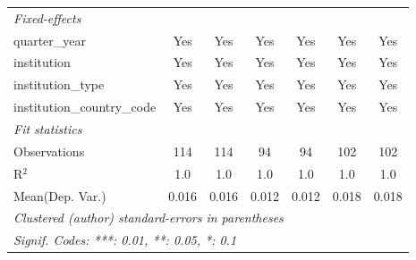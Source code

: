 \begin{tabular}{lcccccc}
   \midrule
   \emph{Fixed-effects}\\
   quarter\_year                      & Yes           & Yes            & Yes            & Yes            & Yes          & Yes\\  
   institution                        & Yes           & Yes            & Yes            & Yes            & Yes          & Yes\\  
   institution\_type                  & Yes           & Yes            & Yes            & Yes            & Yes          & Yes\\  
   institution\_country\_code         & Yes           & Yes            & Yes            & Yes            & Yes          & Yes\\  
   \midrule
   \emph{Fit statistics}\\
   Observations                       & 114           & 114            & 94             & 94             & 102          & 102\\  
   R$^2$                              & 1.0           & 1.0            & 1.0            & 1.0            & 1.0          & 1.0\\  
Mean(Dep. Var.) & 0.016 & 0.016 & 0.012 & 0.012 & 0.018 & 0.018 \\
   \midrule \midrule
   \multicolumn{7}{l}{\emph{Clustered (author) standard-errors in parentheses}}\\
   \multicolumn{7}{l}{\emph{Signif. Codes: ***: 0.01, **: 0.05, *: 0.1}}\\
\end{tabular}
\par\endgroup
